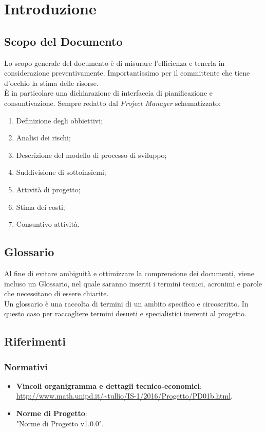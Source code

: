 \documentclass[12pt,a4paper,titlepage]{article}
\begin{document}
	\newpage
	
	\tableofcontents
	\thispagestyle{empty}
	
	\newpage
	
	
	\section{Introduzione}
	\subsection{Scopo del Documento}
	Lo scopo generale del documento è di misurare l'efficienza e tenerla in considerazione preventivamente. Importantissimo per il committente che tiene d'occhio la stima delle risorse. \\
	È in particolare una dichiarazione di interfaccia di pianificazione e consuntivazione. Sempre redatto dal \textit{Project Manager} schematizzato:
	\begin{enumerate}
		\item Definizione degli obbiettivi;
		\item Analisi dei rischi;
		\item Descrizione del modello di processo di sviluppo;
		\item Suddivisione di sottoinsiemi;
		\item Attività di progetto;
		\item Stima dei costi;
		\item Consuntivo attività.
	\end{enumerate} 
	
	\subsection{Glossario}
	Al fine di evitare ambiguità e ottimizzare la comprensione dei documenti, viene incluso un Glossario, nel quale saranno inseriti i termini tecnici, acronimi e parole che necessitano di essere chiarite.\\
	Un glossario è una raccolta di termini di un ambito specifico e circoscritto. In questo caso per raccogliere termini desueti e specialistici inerenti al progetto. 
	
	\subsection{Riferimenti}
	\subsubsection{Normativi}
	\begin{itemize}
		\item \textbf{Vincoli organigramma e dettagli tecnico-economici}: \\
		\textcolor{blue}{\url{http://www.math.unipd.it/~tullio/IS-1/2016/Progetto/PD01b.html}}.
		\item \textbf{Norme di Progetto}: \\
		"Norme di Progetto v1.0.0".
	\end{itemize}
\end{document}

